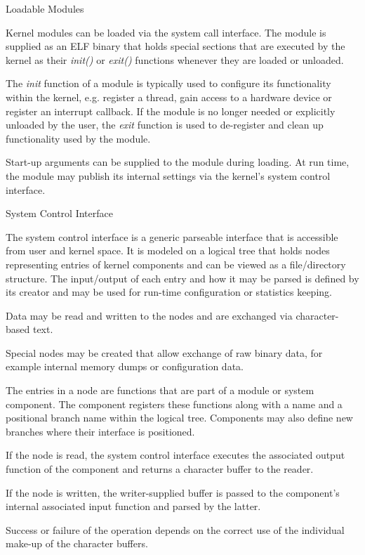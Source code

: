 %
{Loadable Modules}{%
Kernel modules can be loaded via the system call interface. The module is
supplied as an \gls{ELF} binary that holds special sections that are executed
by the kernel as their \emph{init()} or \emph{exit()} functions whenever
they are loaded or unloaded. \newline

The \emph{init} function of a module is typically
used to configure its functionality within the kernel, e.g. register a
thread, gain access to a hardware device or register an interrupt callback.
If the module is no longer needed or explicitly unloaded by the user, the
\emph{exit} function is used to de-register and clean up functionality
used by the module. \newline

Start-up arguments can be supplied to the module during loading. At run time,
the module may publish its internal settings via the kernel's system control
interface.
}%
{}{}


%
{System Control Interface}{%
The system control interface is a generic parseable interface that is accessible
from user and kernel space. It is modeled on a logical tree that holds nodes
representing entries of kernel components and can be viewed as a file/directory
structure. The input/output of each entry and how it may be parsed is defined
by its creator and may be used for run-time configuration or statistics keeping.
\newline

Data may be read and written to the nodes and are exchanged via
character-based text.\newline

Special nodes may be created that allow exchange of raw binary data, for example
internal memory dumps or configuration data.\newline

The entries in a node are functions that are part of a module or system
component. The component registers these functions along with a name and a
positional branch name within the logical tree. Components may also define new
branches where their interface is positioned.\newline

If the node is read, the system control interface executes the associated
output function of the component and returns a character buffer to the reader.
\newline

If the node is written, the writer-supplied buffer is passed to the component's
internal associated input function and parsed by the latter. \newline

Success or failure of the operation depends on the correct use of the individual
make-up of the character buffers.
}%
{}{}


